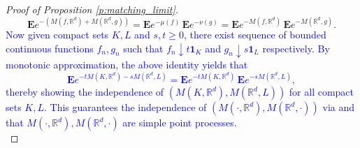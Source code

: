 \documentclass[12pt]{article}
\newcommand{\1}{\mathbf{1}}
\newcommand{\REMOVE}[1]{}
\newcommand{\red}[1]{\textcolor{red}{#1}}
\newcommand{\dy}[1]{\textcolor{blue}{#1}}
\newcommand{\dy}[1]{#1}%
\renewcommand{\footnote}[1]{}
\begin{document}
{{{{{\begin{proof}[Proof of Proposition \ref{p:matching_limit}]
{%
$$ \mathbf{E}e^{-(M(f,\mathbb{R}^d) + M(\mathbb{R}^d ,g))} = \mathbf{E}e^{-\mu(f)} \, \mathbf{E}e^{-\nu(g)} =  \mathbf{E}e^{-M(f,\mathbb{R}^d)} \, \mathbf{E}e^{-M(\mathbb{R}^d ,g)}.$$
%
} \dy{Now given compact sets $K,L$ and $s,t \geq 0$, there exist sequence of bounded continuous functions $f_n,g_n$ such that $f_n \downarrow t\1_K$ and $g_n \downarrow s\1_L$ respectively. By monotonic approximation, the above identity yields that  
%
$$ \mathbf{E}e^{- tM(K,\mathbb{R}^d) - sM(\mathbb{R}^d ,L)} =  \mathbf{E}e^{-tM(K,\mathbb{R}^d)} \, \mathbf{E}e^{-sM(\mathbb{R}^d ,L)},$$
%
thereby showing the independence of $(M(K,\mathbb{R}^d),M(\mathbb{R}^d ,L))$ for all compact sets $K,L$. This guarantees the independence of $(M(\cdot,\mathbb{R}^d),M(\mathbb{R}^d ,\cdot))$ via \cite[Corollary 1.3.15]{baccelli2020random} {and that $M(\cdot,\mathbb{R}^d),M(\mathbb{R}^d ,\cdot)$ are simple point processes}.} \\
%
\REMOVE{for $ I,J$ open intervals of $ \mathbb{R}$,
 \begin{align*}
\mathbf{P}(\mu ( f)\in I)\mathbf{P}(\nu (g)\in J)         %
 = & \mathbf{P}(\mu (  \tilde f)\in I)\mathbf{P}(\nu ( \tilde g)\in J)\\
 = & \lim_{n}\mathbf{P}(\tilde \mu _{n}( \tilde f)\in I)\mathbf{P}(\tilde \nu _{n}( \tilde g)\in J)\\
  = & \lim_{n}\mathbf{P}(\tilde \mu _{n}( \tilde f)\in I,\tilde \nu _{n}( \tilde g)\in J)\\
 = & \lim_{n}\mathbf{E}\Big(\1[\tilde \mu_{n} ( \tilde f)\in I, \tilde \nu_{n} ( \tilde g) \in J]\1[\Omega _{n}]\Big) + O\Big(\mathbf{P}(\Omega _{n}^{c})\Big) \\
 = & \lim_{n}\mathbf{E}\Big(\1[M_{n}(f,\mathbb{R}^{d}) \in I,M_{n}(\mathbb{R}^{d},g)\in J]\1[\Omega _{n}]\Big) + O(\mathbf{P}\Big(\Omega _{n}^{c})\Big) \\

\end{align*}}
\end{proof}}}}}}
\end{document}
